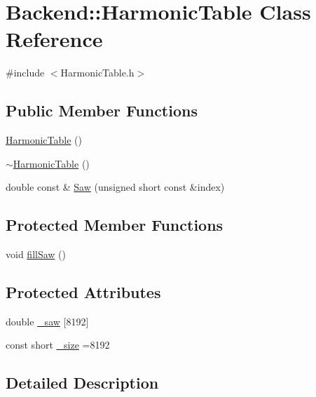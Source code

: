 \hypertarget{class_backend_1_1_harmonic_table}{\section{Backend\+:\+:Harmonic\+Table Class Reference}
\label{class_backend_1_1_harmonic_table}
}


{\ttfamily \#include $<$Harmonic\+Table.\+h$>$}

\subsection*{Public Member Functions}
\begin{DoxyCompactItemize}
\item 
\hyperlink{class_backend_1_1_harmonic_table_a3ea23b72d602447940c3d97ba75e5902}{Harmonic\+Table} ()
\item 
\hyperlink{class_backend_1_1_harmonic_table_a1c3662131adb3c8e64d1ad1cd8a65a20}{$\sim$\+Harmonic\+Table} ()
\item 
double const \& \hyperlink{class_backend_1_1_harmonic_table_a6b7336f4f6184337350f282d5b0c5467}{Saw} (unsigned short const \&index)
\end{DoxyCompactItemize}
\subsection*{Protected Member Functions}
\begin{DoxyCompactItemize}
\item 
void \hyperlink{class_backend_1_1_harmonic_table_a3b69fe79e5ddd9abfc13fc9a16de80c8}{fill\+Saw} ()
\end{DoxyCompactItemize}
\subsection*{Protected Attributes}
\begin{DoxyCompactItemize}
\item 
double \hyperlink{class_backend_1_1_harmonic_table_a464db802494a562d2c9d0840ee6d1483}{\+\_\+saw} \mbox{[}8192\mbox{]}
\item 
const short \hyperlink{class_backend_1_1_harmonic_table_a94c9f17b8fd4b514d145fbb8b0ed63dd}{\+\_\+size} =8192
\end{DoxyCompactItemize}


\subsection{Detailed Description}


